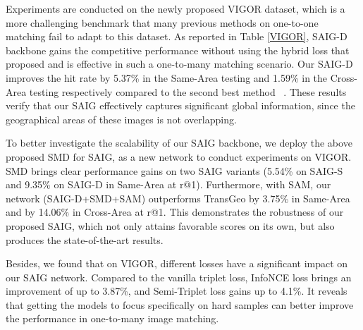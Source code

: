 \documentclass[sn-basic,iicol]{sn-jnl}
\theoremstyle{thmstyletwo}\newtheorem{example}{Example}\newtheorem{remark}{Remark}
\theoremstyle{thmstylethree}\newtheorem{definition}{Definition}
\begin{document}
 Experiments are conducted on the newly proposed VIGOR dataset, which is a more challenging benchmark that many previous methods on one-to-one matching fail to adapt to this dataset. As reported in Table \ref{VIGOR}, SAIG-D backbone gains the competitive performance without using the hybrid loss that ~\cite{VIGOR2021} proposed and is effective in such a one-to-many matching scenario. Our SAIG-D improves the hit rate by 5.37\% in the Same-Area testing and 1.59\% in the Cross-Area testing respectively compared to the second best method ~\citep{VIGOR2021}. These results verify that our SAIG effectively captures significant global information, since the geographical areas of these images is not overlapping. 

To better investigate the scalability of our SAIG backbone, we deploy the above proposed SMD for SAIG, as a new network to conduct experiments on VIGOR. SMD brings clear performance gains on two SAIG variants (5.54\% on SAIG-S and 9.35\% on SAIG-D in Same-Area at r@1). 
Furthermore, with SAM, our network (SAIG-D+SMD+SAM) outperforms TransGeo by 3.75\% in Same-Area and by 14.06\% in Cross-Area at r@1.
This demonstrates the robustness of our proposed SAIG, which not only attains favorable scores on its own, but also produces the state-of-the-art results. 


Besides, we found that on VIGOR, different losses have a significant impact on our SAIG network. Compared to the vanilla triplet loss, InfoNCE loss brings an improvement of up to 3.87\%, and Semi-Triplet loss gains up to 4.1\%. It reveals that getting the models to focus specifically on hard samples can better improve the performance in one-to-many image matching.
\end{document}
